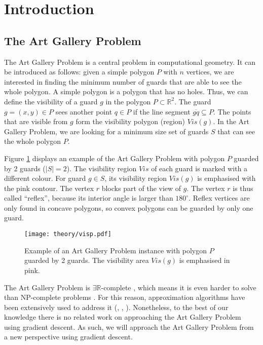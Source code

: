 \section{Introduction}
\subsection{The Art Gallery Problem}

The Art Gallery Problem \cite{o1987art} is a central problem in computational geometry. It can be introduced as follows: given a simple polygon $P$ with $n$ vertices, we are interested in finding the minimum number of guards that are able to see the whole polygon. A simple polygon is a polygon that has no holes. Thus, we can define the visibility of a guard $g$ in the polygon $P \subset \mathbb R^2$. The guard $g = (x, y) \in P$ sees another point $q \in P$ if the line segment $\overline{gq} \subseteq P$. The points that are visible from $g$ form the visibility polygon (region) $\mathit{Vis}(g)$. In the Art Gallery Problem, we are looking for a minimum size set of guards $S$ that can see the whole polygon $P$.

Figure \ref{fig:art} displays an example of the Art Gallery Problem with polygon $P$ guarded by 2 guards ($|S| = 2$). The visibility region $\mathit{Vis}$ of each guard is marked with a different colour. For guard $g \in S$, its visibility region $\mathit{Vis}(g)$ is emphasised with the pink contour. The vertex $r$ blocks part of the view of $g$. The vertex $r$ is thus called ``reflex'', because its interior angle is larger than $180^\circ$. Reflex vertices are only found in concave polygons, so convex polygons can be guarded by only one guard.

\begin{figure}[h!]
    \centering
    \texttt{[image: theory/visp.pdf]}
    \caption{Example of an Art Gallery Problem instance with polygon $P$ guarded by 2 guards. The visibility area $\mathit{Vis}(g)$ is emphasised in pink.}
    \label{fig:art}
\end{figure}

The Art Gallery Problem is $\exists \mathbb R$-complete \cite{abrahamsen2021art}, which means it is even harder to solve than NP-complete problems \cite{schaefer2009complexity}. For this reason, approximation algorithms have been extensively used to address it (\cite{DBLP:journals/corr/BonnetM16b}, \cite{GHOSH2010718}, \cite{DBLP:journals/corr/abs-2007-06920}). Nonetheless, to the best of our knowledge there is no related work on approaching the Art Gallery Problem using gradient descent. As such, we will approach the Art Gallery Problem from a new perspective using gradient descent.

